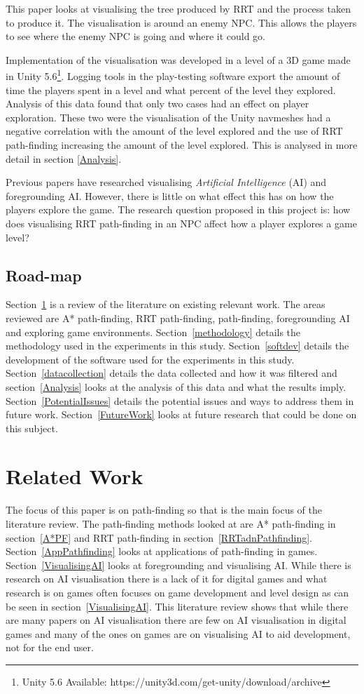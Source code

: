\documentclass[journal]{IEEEtran}
\begin{document}
	This paper looks at visualising the tree produced by RRT and the process taken to produce it. The visualisation is around an enemy NPC. This allows the players to see where the enemy NPC is going and where it could go. 
	
	Implementation of the visualisation was developed in a level of a 3D game made in Unity 5.6\footnote[1]{Unity 5.6 Available: https://unity3d.com/get-unity/download/archive}. Logging tools in the play-testing software export the amount of time the players spent in a level and what percent of the level they explored. Analysis of this data found that only two cases had an effect on player exploration. These two were the visualisation of the Unity navmeshes had a negative correlation with the amount of the level explored and the use of RRT path-finding increasing the amount of the level explored. This is analysed in more detail in section \ref{Analysis}.
	
	Previous papers have researched visualising \textit{Artificial Intelligence} (AI) and foregrounding AI. However, there is little on what effect this has on how the players explore the game.
	The research question proposed in this project is: how does visualising RRT path-finding in an NPC affect how a player explores a game level?
	
	\subsection{Road-map}
	Section~\ref{RelatedWork} is a review of the literature on existing relevant work. The areas reviewed are A* path-finding, RRT path-finding, path-finding, foregrounding AI and exploring game environments. 
	Section~\ref{methodology} details the methodology used in the experiments in this study. Section~\ref{softdev} details the development of the software used for the experiments in this study.
	Section~\ref{datacollection} details the data collected and how it was filtered and section~\ref{Analysis} looks at the analysis of this data and what the results imply. Section~\ref{PotentialIssues} details the potential issues and ways to address them in future work. Section~\ref{FutureWork} looks at future research that could be done on this subject. 
	
	\section{Related Work} \label{RelatedWork}
	The focus of this paper is on path-finding so that is the main focus of the literature review. The path-finding methods looked at are A* path-finding in section~\ref{A*PF} and RRT path-finding in section~\ref{RRTadnPathfinding}. Section~\ref{AppPathfinding} looks at applications of path-finding in games. Section~\ref{VisualisingAI} looks at foregrounding and visualising AI. While there is research on AI visualisation there is a lack of it for digital games and what research is on games often focuses on game development and level design as can be seen in section~\ref{VisualisingAI}. 
	This literature review shows that while there are many papers on AI visualisation there are few on AI visualisation in digital games and many of the ones on games are on visualising AI to aid development, not for the end user.     
	
\end{document}
